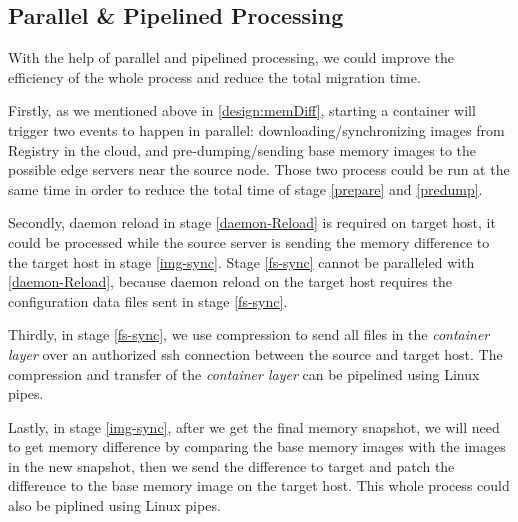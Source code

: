 




\subsection{Parallel \&  Pipelined Processing}\label{design:pipe}

With the help of parallel and pipelined processing,  we could improve the efficiency of the whole process and reduce the total migration time.


Firstly, as we mentioned above in \ref{design:memDiff}, starting a container will trigger two events to happen in parallel: downloading/synchronizing images from Registry in the cloud, and pre-dumping/sending base memory images to the possible edge servers near the source node. Those two process could be run at the same time in order to reduce the total time of stage \ref{prepare} and \ref{predump}. 

Secondly, daemon reload in stage \ref{daemon-Reload} is required on target host, it could be processed while the source server is sending the memory difference to the target host in stage \ref{img-sync}. Stage \ref{fs-sync} cannot be paralleled with \ref{daemon-Reload}, because daemon reload on the target host requires the configuration data files sent in stage \ref{fs-sync}.

Thirdly,
in stage \ref{fs-sync}, we use compression to send all files in the \textit{container layer} over an authorized ssh connection between the source and target host. The compression and transfer of the \textit{container layer} can be pipelined using Linux pipes.

Lastly, in stage \ref{img-sync}, after we get the final memory snapshot, we will need to get memory difference by comparing the base memory images with the images in the new snapshot, then we send the difference to target and patch the difference to the base memory image on the target host. This whole process could also be piplined using Linux pipes. 
